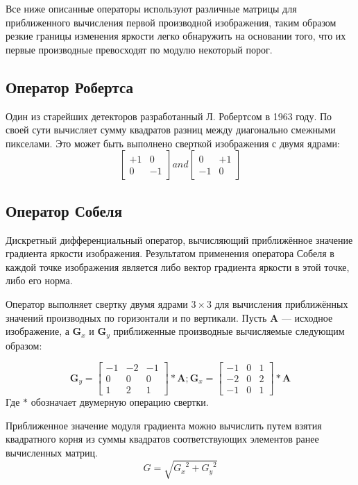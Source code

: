 Все ниже описанные операторы используют различные матрицы для приближенного вычисления первой производной изображения, таким образом резкие границы изменения яркости легко обнаружить на основании того, что их первые производные превосходят по модулю некоторый порог.
\subsection{Оператор Робертса}
Один из старейших детекторов разработанный Л. Робертсом в 1963 году\cite{RobertsPhD}. По своей сути вычисляет сумму квадратов разниц между диагонально смежными пикселами. Это может быть выполнено сверткой изображения с двумя ядрами:
$$ 
\begin{bmatrix}
+1 & 0\\
0 & -1
\end{bmatrix}
and
\begin{bmatrix}
0 & +1\\
-1 & 0
\end{bmatrix}
$$
\subsection{Оператор Собеля}
Дискретный дифференциальный оператор, вычисляющий приближённое значение градиента яркости изображения. Результатом применения оператора Собеля в каждой точке изображения является либо вектор градиента яркости в этой точке, либо его норма. \cite{Sobel_14}

Оператор выполняет свертку двумя ядрами $3 \times 3$ для вычисления приближённых значений производных по горизонтали и по вертикали. Пусть $\mathbf{A}$ --- исходное изображение, а $\mathbf{G}_x$ и $\mathbf{G}_y$ приближенные производные вычисляемые следующим образом:

$$ 
\mathbf{G}_y =
\begin{bmatrix}
    -1 & -2 & -1\\
    0 & 0 & 0 \\
    1 & 2 & 1    
\end{bmatrix}
\ast \mathbf{A}
;
\mathbf{G}_x =
\begin{bmatrix}
    -1 & 0 & 1\\
    -2 & 0 & 2 \\
    -1 & 0 & 1 
\end{bmatrix}
\ast \mathbf{A}
$$
Где $\ast$ обозначает двумерную операцию свертки.

Приближенное значение модуля градиента можно вычислить путем взятия квадратного корня из суммы квадратов соответствующих элементов ранее вычисленных матриц.
$$
G = \sqrt{{G_x}^2 + {G_y}^2}
$$

